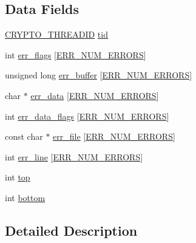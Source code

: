 \subsection*{Data Fields}
\begin{DoxyCompactItemize}
\item 
\hyperlink{crypto_2crypto_8h_a5da789a29aa0f39047c22cfe52462226}{C\+R\+Y\+P\+T\+O\+\_\+\+T\+H\+R\+E\+A\+D\+ID} \hyperlink{structerr__state__st_afa854c76b90fea7cd16eade5477a6980}{tid}
\item 
int \hyperlink{structerr__state__st_acb1c3c035c80936c05d086044c8acf54}{err\+\_\+flags} \mbox{[}\hyperlink{include_2openssl_2err_8h_a98c5e234fbf0071b18ac9cfb7f3dc344}{E\+R\+R\+\_\+\+N\+U\+M\+\_\+\+E\+R\+R\+O\+RS}\mbox{]}
\item 
unsigned long \hyperlink{structerr__state__st_a64d5b4f1e28d753b84432495c9ffb6ee}{err\+\_\+buffer} \mbox{[}\hyperlink{include_2openssl_2err_8h_a98c5e234fbf0071b18ac9cfb7f3dc344}{E\+R\+R\+\_\+\+N\+U\+M\+\_\+\+E\+R\+R\+O\+RS}\mbox{]}
\item 
char $\ast$ \hyperlink{structerr__state__st_a84dd9b5b86a0e7aeea09f0c35935a805}{err\+\_\+data} \mbox{[}\hyperlink{include_2openssl_2err_8h_a98c5e234fbf0071b18ac9cfb7f3dc344}{E\+R\+R\+\_\+\+N\+U\+M\+\_\+\+E\+R\+R\+O\+RS}\mbox{]}
\item 
int \hyperlink{structerr__state__st_a97476059b725cf24d11cbf4d1bd73730}{err\+\_\+data\+\_\+flags} \mbox{[}\hyperlink{include_2openssl_2err_8h_a98c5e234fbf0071b18ac9cfb7f3dc344}{E\+R\+R\+\_\+\+N\+U\+M\+\_\+\+E\+R\+R\+O\+RS}\mbox{]}
\item 
const char $\ast$ \hyperlink{structerr__state__st_aa6fb44689ad9605039a1749d6a6341c0}{err\+\_\+file} \mbox{[}\hyperlink{include_2openssl_2err_8h_a98c5e234fbf0071b18ac9cfb7f3dc344}{E\+R\+R\+\_\+\+N\+U\+M\+\_\+\+E\+R\+R\+O\+RS}\mbox{]}
\item 
int \hyperlink{structerr__state__st_a28ee73f4b59da01b8576cc14767c4455}{err\+\_\+line} \mbox{[}\hyperlink{include_2openssl_2err_8h_a98c5e234fbf0071b18ac9cfb7f3dc344}{E\+R\+R\+\_\+\+N\+U\+M\+\_\+\+E\+R\+R\+O\+RS}\mbox{]}
\item 
int \hyperlink{structerr__state__st_af93f4f37fc2ad9c37af4a715423b110c}{top}
\item 
int \hyperlink{structerr__state__st_a323a7064fba6e15e3e542e34fb19764e}{bottom}
\end{DoxyCompactItemize}


\subsection{Detailed Description}


